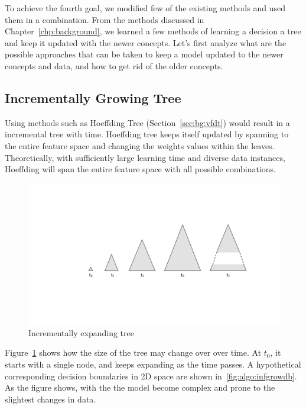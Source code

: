 To achieve the fourth goal, we modified few of the existing methods and used them in a combination. From the methods discussed in Chapter~\ref{chp:background}, we learned a few methods of learning a decision a tree and keep it updated with the newer concepts. Let's first analyze what are the possible approaches that can be taken to keep a model updated to the newer concepts and data, and how to get rid of the older concepts.

\subsection{Incrementally Growing Tree}
Using methods such as Hoeffding Tree (Section~\ref{sec:bg:vfdt}) would result in a incremental tree with time. Hoeffding tree keeps itself updated by spanning to the entire feature space and changing the weights values within the leaves. Theoretically, with sufficiently large learning time and diverse data instances, Hoeffding will span the entire feature space with all possible combinations.

\begin{figure}[htbp]
    \begin{center}
        \includegraphics[width=14.0cm]{figs/infgrow.pdf}
        \caption{Incrementally expanding tree}
        \label{fig:algo:infgrow}
    \end{center}
\end{figure}

Figure~\ref{fig:algo:infgrow} shows how the size of the tree may change over over time. At $t_0$, it starts with a single node, and keeps expanding as the time passes. A hypothetical corresponding decision boundaries in 2D space are shown in~\ref{fig:algo:infgrowdb}. As the figure shows, with the the model become complex and prone to the slightest changes in data.

